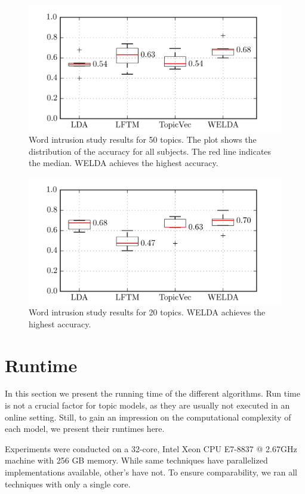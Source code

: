 \documentclass[
        a4paper,
        titlepage,
        twoside,
        parskip,
        numbers=noenddot
        ]{scrbook}
\theoremstyle{break}
\begin{document}
\begin{figure}
       \centering
       \includegraphics[width=12cm]{figures/word_intrusion_50.png}
       \caption{Word intrusion study results for 50 topics. The plot shows the distribution of the accuracy for all subjects. The red line indicates the median. WELDA achieves the highest accuracy.}
       \label{fig:word_intrusion_50}
\end{figure}

\begin{figure}
       \centering
       \includegraphics[width=12cm]{figures/word_intrusion_20.png}
       \caption{Word intrusion study results for 20 topics. WELDA achieves the highest accuracy.}
       \label{fig:word_intrusion_20}
\end{figure}

\section{Runtime}
\label{sec:runtime}

In this section we present the running time of the different algorithms.
Run time is not a crucial factor for topic models, as they are usually not executed in an online setting.
Still, to gain an impression on the computational complexity of each model, we present their runtimes here.

Experiments were conducted on a 32-core, Intel Xeon CPU E7-8837 @ 2.67GHz machine with 256 GB memory.
While same techniques have parallelized implementations available, other's have not.
To ensure comparability, we ran all techniques with only a single core.
\end{document}
